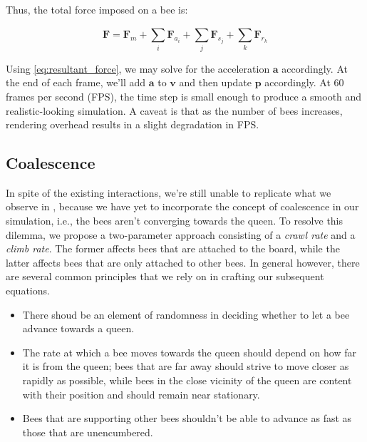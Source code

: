 \documentclass[a4paper,10pt]{article}
\begin{document}
\begin{multicols}{2}
    Thus, the total force imposed on a bee is:

    \begin{equation}
        \label{eq:resultant_force}
        \mathbf{F} = \mathbf{F}_{m} + \sum_{i}^{}\mathbf{F}_{a_{i}} + \sum_{j}^{}\mathbf{F}_{s_{j}} + \sum_{k}^{}\mathbf{F}_{r_{k}}
    \end{equation}

    Using \eqref{eq:resultant_force}, we may solve for the acceleration $\mathbf{a}$ accordingly.
    At the end of each frame, we'll add $\mathbf{a}$ to $\mathbf{v}$ and then update $\mathbf{p}$
    accordingly. At $60$ frames per second (FPS), the time step is small enough to produce
    a smooth and realistic-looking simulation. A caveat is that as the number of bees
    increases, rendering overhead results in a slight degradation in FPS.

    \subsection{Coalescence}

    In spite of the existing interactions, we're still unable to replicate what we observe
    in \cite{peleg2018collective}, because we have yet to incorporate the concept of coalescence
    in our simulation, i.e., the bees aren't converging towards the queen. To resolve
    this dilemma, we propose a two-parameter approach consisting of a \textit{crawl rate}
    and a \textit{climb rate}. The former affects bees that are attached to the board,
    while the latter affects bees that are only attached to other bees. In general however,
    there are several common principles that we rely on in crafting our subsequent equations.

    \begin{itemize}
        \item There shoud be an element of randomness in deciding whether to let a bee advance
        towards a queen.
        \item The rate at which a bee moves towards the queen should depend on how far it
        is from the queen; bees that are far away should strive to move closer as rapidly
        as possible, while bees in the close vicinity of the queen are content with their
        position and should remain near stationary.
        \item Bees that are supporting other bees shouldn't be able to advance as fast as
        those that are unencumbered.
    \end{itemize}


\end{multicols}
\end{document}
